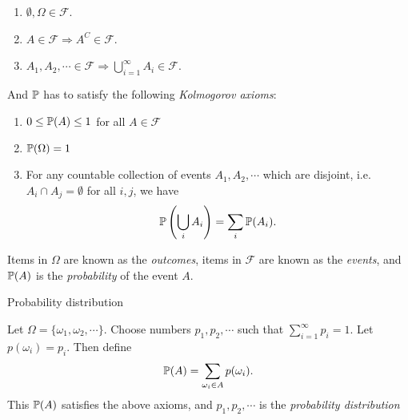 \begin{note}
\begin{field}
\begin{defi}
      \begin{enumerate}
        \item $\emptyset, \Omega\in \mathcal{F}$.
        \item $A\in \mathcal{F} \Rightarrow A^C\in \mathcal{F}$.
        \item $A_1, A_2, \cdots \in \mathcal{F} \Rightarrow \bigcup_{i = 1}^\infty A_i \in \mathcal{F}$.
      \end{enumerate}
      And $\P$ has to satisfy the following \emph{Kolmogorov axioms}:
      \begin{enumerate}
        \item $0 \leq \P(A) \leq 1 $ for all $A\in \mathcal{F}$
        \item $\P(\Omega) = 1$
        \item For any countable collection of events $A_1, A_2, \cdots$ which are disjoint, i.e.\ $A_i\cap A_j = \emptyset$ for all $i, j$, we have
          \[
            \P\left(\bigcup_i A_i\right) = \sum_i \P(A_i).
          \]
      \end{enumerate}
      Items in $\Omega$ are known as the \emph{outcomes}, items in $\mathcal{F}$ are known as the \emph{events}, and $\P(A)$ is the \emph{probability} of the event $A$.
    \end{defi}
  \end{field}
  \xplain{}%
\end{note}

%
\begin{note}
  \begin{field}
    Probability distribution
  \end{field}
  \begin{field}
    \begin{defi}
      Let $\Omega = \{\omega_1, \omega_2, \cdots\}$. Choose numbers $p_1, p_2, \cdots $ such that $\sum_{i = 1}^\infty p_i= 1$. Let $p(\omega_i) = p_i$. Then define
      \[
        \P(A) = \sum_{\omega_i\in A} p(\omega_i).
      \]
      This $\P(A)$ satisfies the above axioms, and $p_1, p_2, \cdots$ is the \emph{probability distribution}
    \end{defi}
  \end{field}
  \xplain{}%
\end{note}

